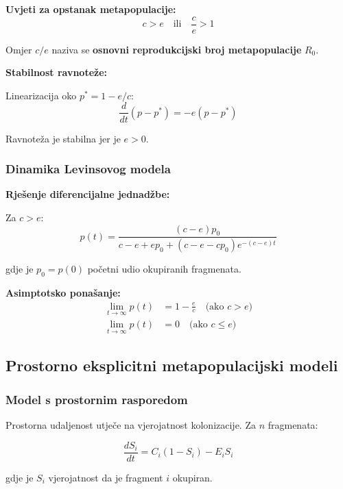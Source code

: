 \documentclass[11pt,oneside]{book}
\begin{document}
\textbf{Uvjeti za opstanak metapopulacije:}
\begin{equation}
	c > e \quad \text{ili} \quad \frac{c}{e} > 1
\end{equation}

Omjer $c/e$ naziva se \textbf{osnovni reprodukcijski broj metapopulacije} $R_0$.

\textbf{Stabilnost ravnoteže:}

Linearizacija oko $p^* = 1 - e/c$:
\begin{equation}
	\frac{d}{dt}(p - p^*) = -e(p - p^*)
\end{equation}

Ravnoteža je stabilna jer je $e > 0$.

\subsubsection{Dinamika Levinsovog modela}

\textbf{Rješenje diferencijalne jednadžbe:}

Za $c > e$:
\begin{equation}
	p(t) = \frac{(c-e)p_0}{c-e + ep_0 + (c-e-cp_0)e^{-(c-e)t}}
\end{equation}

gdje je $p_0 = p(0)$ početni udio okupiranih fragmenata.

\textbf{Asimptotsko ponašanje:}
\begin{align}
	\lim_{t \to \infty} p(t) &= 1 - \frac{e}{c} \quad \text{(ako } c > e\text{)} \\
	\lim_{t \to \infty} p(t) &= 0 \quad \text{(ako } c \leq e\text{)}
\end{align}

\subsection{Prostorno eksplicitni metapopulacijski modeli}

\subsubsection{Model s prostornim rasporedom}

Prostorna udaljenost utječe na vjerojatnost kolonizacije. Za $n$ fragmenata:

\begin{equation}
	\frac{dS_i}{dt} = C_i(1-S_i) - E_i S_i
\end{equation}

gdje je $S_i$ vjerojatnost da je fragment $i$ okupiran.
\end{document}

